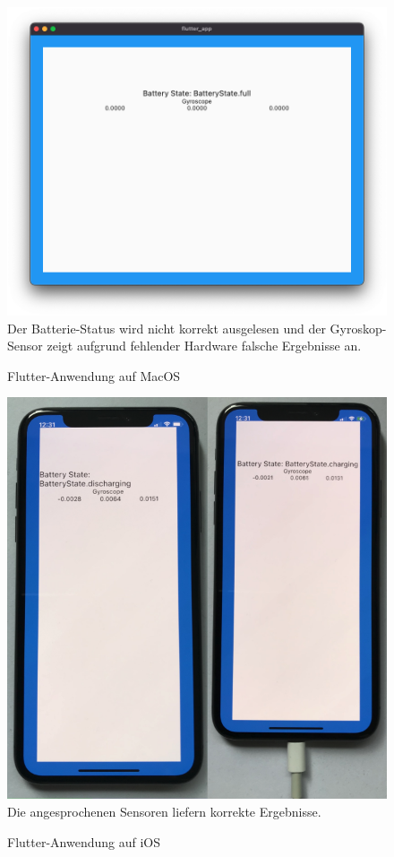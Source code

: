 \documentclass[a4paper]{scrartcl}
\begin{document}
\begin{figure}[H]
	\centering
	\caption{Flutter-Anwendung auf MacOS}
	\includegraphics[scale=0.35]{_assets/Mac_Flutter_plugged.png} \\
	\justifying
	\small	
	Der Batterie-Status wird nicht korrekt ausgelesen und der Gyroskop-Sensor zeigt aufgrund fehlender Hardware falsche Ergebnisse an.
\end{figure}

\begin{figure}[H]
	\centering
	\caption{Flutter-Anwendung auf iOS}
	\includegraphics[scale=0.35]{_assets/iOS_Flutter.png} \\
	\justifying
	\small	
	Die angesprochenen Sensoren liefern korrekte Ergebnisse.
\end{figure}
\end{document}
